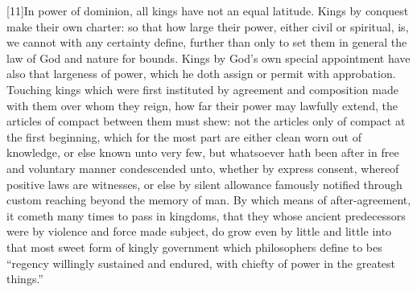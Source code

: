 [11]In power of dominion, all kings have not an equal latitude. Kings by conquest make their own charter: so that how large their power, either civil or spiritual, is, we cannot with any certainty define, further than only to set them in general the law of God and nature for bounds. Kings by God’s own special appointment have also that largeness of power, which he doth assign or permit with approbation. Touching kings which were first instituted by agreement and composition made with them over whom they reign, how far their power may lawfully extend, the articles of compact between them must shew: not the articles only of compact at the first beginning, which for the most part are either clean worn out  of knowledge, or else known unto very few, but whatsoever hath been after in free and voluntary manner condescended unto, whether by express consent, whereof positive laws are witnesses, or else by silent allowance famously notified through custom reaching beyond the memory of man. By which means of after-agreement, it cometh many times to pass in kingdoms, that they whose ancient predecessors were by violence and force made subject, do grow even by little and little into that most sweet form of kingly government which philosophers define to bes “regency willingly sustained and endured, with chiefty of power in the greatest things.”

